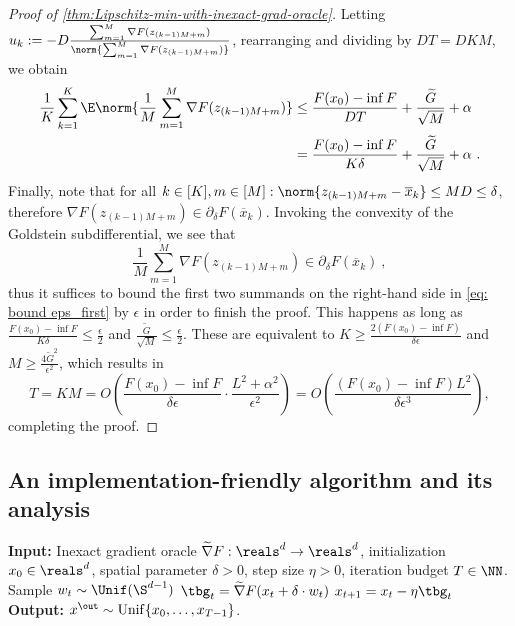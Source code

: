 \begin{proof}[Proof of \cref{thm:Lipschitz-min-with-inexact-grad-oracle}]
Letting $u_k:=-D\frac{\sum_{m=1}^{M}\nabla F(z_{(k-1)M+m})}{\norm{\sum_{m=1}^{M}\nabla F(z_{(k-1)M+m})}}$, rearranging and dividing by $DT=DKM$, we obtain
\begin{align}
\frac{1}{K}\sum_{k=1}^{K}\E\norm{\frac{1}{M}\sum_{m=1}^{M}\nabla F(z_{(k-1)M+m})}
&\leq \frac{F(x_0)-\inf F}{DT}+\frac{\widetilde{G}}{\sqrt{M}}+\alpha
\nonumber\\
&=\frac{F(x_0)-\inf F}{K\delta}
+\frac{\widetilde{G}}{\sqrt{M}}+\alpha~.
\label{eq: bound eps_first}
\end{align}
Finally, note that for all $k\in[K],m\in[M]:\norm{z_{(k-1)M+m}-\overline{x}_{k}}\leq M D\leq\delta$, therefore
$\nabla F(z_{(k-1)M+m})\in\partial_\delta F(\overline{x}_{k})$. Invoking the convexity of the Goldstein subdifferential, we see that
\[
\frac{1}{M}\sum_{m=1}^{M}\nabla F(z_{(k-1)M+m})\in\partial_\delta  F(\overline{x}_{k})~,
\]
thus it suffices to bound the first two summands on the right-hand side in \cref{eq: bound eps_first} by $\epsilon$ in order to finish the proof. This happens as long as $
\frac{F(x_0)-\inf F}{K\delta}\leq\frac{\epsilon}{2}$ and $\frac{\widetilde{G}}{\sqrt{M}}\leq\frac{\epsilon}{2}$. These are  equivalent to $ K\geq \frac{2(F(x_0)-\inf F)}{\delta\epsilon}$ and $M\geq\frac{4\widetilde{G}^2}{\epsilon^2}$, 
which results in \[T=KM=O\left(\frac{F(x_0)-\inf F}{\delta\epsilon}\cdot \frac{L^2+\alpha^2}{\epsilon^2}\right)=O\left(\frac{(F(x_0)-\inf F)L^2}{\delta\epsilon^3}\right),\] completing the proof.
\end{proof}










\subsection{An implementation-friendly algorithm and its analysis}
\begin{algorithm}[h]
\begin{algorithmic}[1]\caption{Perturbed Inexact GD}\label{alg: PIGD}
\State \textbf{Input:}
Inexact gradient oracle $\widetilde{\nabla}F:\reals^d\to\reals^d$, initialization $x_0\in\reals^d$, spatial parameter $\delta>0$, step size $\eta>0$, iteration budget $T\in\NN$.
\State Sample $w_t\sim\Unif(\S^{d-1})$
\State $\tbg_t=\widetilde{\nabla}F(x_{t}+\delta\cdot w_t)$
\State $x_{t+1}
=x_t-\eta\tbg_t
$
\EndFor
\State \textbf{Output:} $x^{\out}\sim\mathrm{Unif}\{x_0,\dots,x_{T-1}\}$. 
\end{algorithmic}
\end{algorithm}


